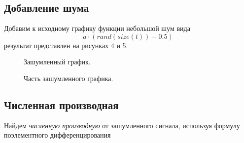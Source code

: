 \documentclass[a5paper, 10pt]{article}
\theoremstyle{definition}
\theoremstyle{plain}
\theoremstyle{remark}
\begin{document}
\newpage
\subsection{Добавление шума}

Добавим к исходному графику функции небольшой шум вида $$a \cdot \left( rand (size(t)) - 0.5  \right)$$ результат представлен на рисунках 4 и 5.

\begin{figure}[h!]
\caption{Зашумленный график.}
\caption{Часть зашумленного графика.}
\end{figure}


\newpage
\subsection{Численная производная}
Найдем \textit{численную производную} от зашумленного сигнала, используя формулу поэлементного дифференцирования
\end{document}
